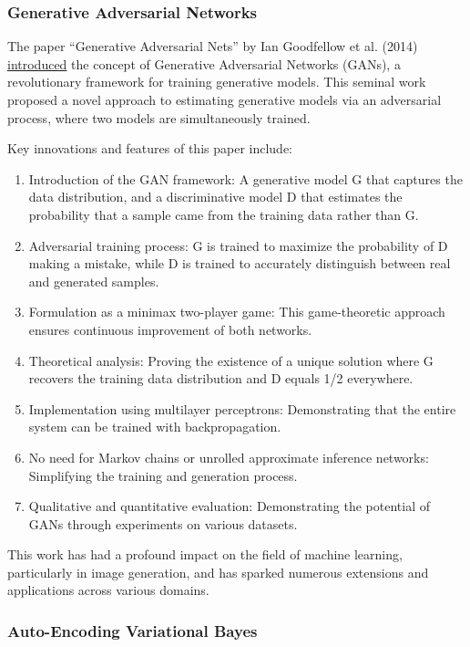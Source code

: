 \documentclass{article}
\begin{document}
\subsubsection*{Generative Adversarial Networks}

The paper ``Generative Adversarial Nets'' by Ian Goodfellow et al. (2014) \href{https://arxiv.org/abs/1406.2661}{introduced} the concept of Generative Adversarial Networks (GANs), a revolutionary framework for training generative models.\cite{Goodfellow2014} This seminal work proposed a novel approach to estimating generative models via an adversarial process, where two models are simultaneously trained.

Key innovations and features of this paper include:
\begin{enumerate}
    \item Introduction of the GAN framework: A generative model G that captures the data distribution, and a discriminative model D that estimates the probability that a sample came from the training data rather than G.
    \item Adversarial training process: G is trained to maximize the probability of D making a mistake, while D is trained to accurately distinguish between real and generated samples.
    \item Formulation as a minimax two-player game: This game-theoretic approach ensures continuous improvement of both networks.
    \item Theoretical analysis: Proving the existence of a unique solution where G recovers the training data distribution and D equals 1/2 everywhere.
    \item Implementation using multilayer perceptrons: Demonstrating that the entire system can be trained with backpropagation.
    \item No need for Markov chains or unrolled approximate inference networks: Simplifying the training and generation process.
    \item Qualitative and quantitative evaluation: Demonstrating the potential of GANs through experiments on various datasets.
\end{enumerate}

This work has had a profound impact on the field of machine learning, particularly in image generation, and has sparked numerous extensions and applications across various domains.

\subsubsection*{Auto-Encoding Variational Bayes}
\end{document}
